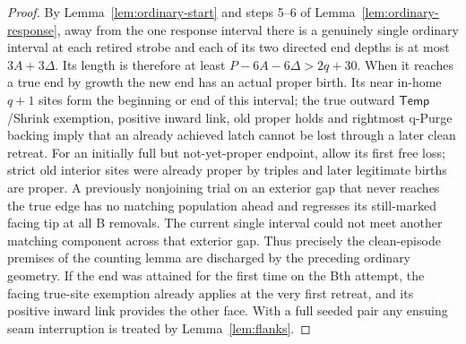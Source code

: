 \begin{proof}
By Lemma~\ref{lem:ordinary-start} and steps 5--6 of Lemma~\ref{lem:ordinary-response}, away from the one response interval there is a genuinely single ordinary interval at each retired strobe and each of its two directed end depths is at most \(3A+3\Delta \). Its length is therefore at least \(P- 6A- 6\Delta >2q+30\). When it reaches a true end by growth the new end has an actual proper birth. Its near in-home \(q+1\) sites form the beginning or end of this interval; the true outward \(\mathsf{Temp}\)/Shrink exemption, positive inward link, old proper holds and rightmost q-Purge backing imply that an already achieved latch cannot be lost through a later clean retreat. For an initially full but not-yet-proper endpoint, allow its first free loss; strict old interior sites were already proper by triples and later legitimate births are proper. A previously nonjoining trial on an exterior gap that never reaches the true edge has no matching population ahead and regresses its still-marked facing tip at all B removals. The current single interval could not meet another matching component across that exterior gap. Thus precisely the clean-episode premises of the counting lemma are discharged by the preceding ordinary geometry. If the end was attained for the first time on the Bth attempt, the facing true-site exemption already applies at the very first retreat, and its positive inward link provides the other face. With a full seeded pair any ensuing seam interruption is treated by Lemma~\ref{lem:flanks}.
\end{proof}

